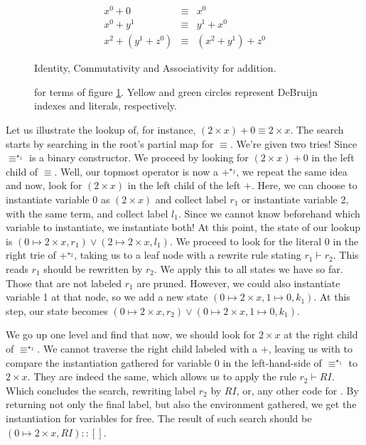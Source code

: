 \begin{figure}[h]
\begin{eqnarray*}
  x^0 + 0 & \equiv & x^0 \\
  x^0 + y^1 & \equiv & y^1 + x^0 \\
  x^2 + (y^1 + z^0) & \equiv & (x^2 + y^1) + z^0
\end{eqnarray*}
\caption{Identity, Commutativity and Associativity for addition.}
\label{fig:trie1terms}
\end{figure}

\begin{figure}[h]

\caption{\mytrie for terms of figure \ref{fig:trie1terms}. Yellow and green circles represent DeBruijn indexes and literals, respectively.}
\label{fig:btrie1}
\end{figure}

Let us illustrate the lookup of, for instance, $(2 \times x) + 0 \equiv 2 \times x$.
The search starts by searching in the root's partial map for $\equiv$. We're given
two tries! Since $\equiv^{\star_1}$ is a binary constructor. We proceed by looking for $(2 \times x) + 0$
in the left child of $\equiv$. Well, our topmost operator is now a $+^{\star_2}$, we repeat the same idea and
now, look for $(2 \times x)$ in the left child of the left $+$. Here, we can choose
to instantiate variable 0 as $(2 \times x)$ and collect label $r_1$ or
instantiate variable 2, with the same term, and collect label $l_1$. Since we cannot know beforehand
which variable to instantiate, we instantiate both! At this point, the state of our lookup is
$(0 \mapsto 2 \times x , r_1) \vee (2 \mapsto 2 \times x , l_1)$.
We proceed to look for the literal $0$ in the right trie of $+^{\star_2}$, taking us to a leaf node with
a rewrite rule stating $r_1 \vdash r_2$. This reads $r_1$ should be rewritten by $r_2$. We apply
this to all states we have so far. Those that are not labeled $r_1$ are pruned. 
However, we could also instantiate variable 1 at that node, so
we add a new state $(0 \mapsto 2 \times x, 1 \mapsto 0 , k_1)$. At this step,
our state becomes $(0 \mapsto 2 \times x , r_2) \vee (0 \mapsto 2 \times x, 1 \mapsto 0 , k_1)$. 

We go up one level and find that
now, we should look for $2 \times x$ at the right child of $\equiv^{\star_1}$. We cannot traverse the
right child labeled with a $+$, leaving us with to compare the instantiation gathered for
variable 0 in the left-hand-side of $\equiv^{\star_1}$ to $2 \times x$. They are indeed the same,
which allows us to apply the rule $r_2 \vdash RI$. Which concludes the search, rewriting label $r_2$
by $RI$, or, any other code for . By returning not only the final label, but
also the environment gathered, we get the instantiation for variables for free.
The result of such search should be $(0 \mapsto 2 \times x , RI) :: []$.

